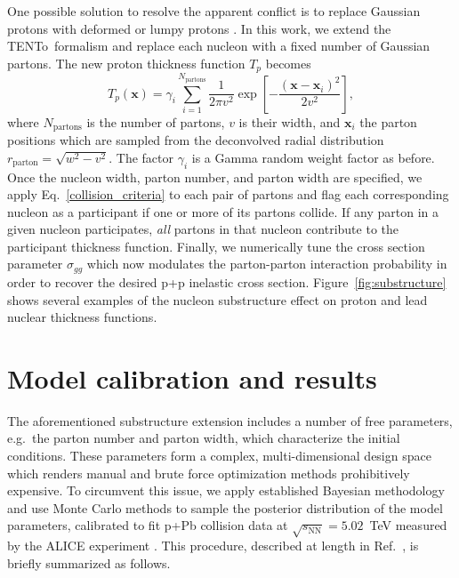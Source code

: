 \documentclass[3p,times,procedia]{elsarticle}
\newcommand{\trento}{T\raisebox{-0.3ex}{R}ENTo}
\begin{document}
One possible solution to resolve the apparent conflict is to replace Gaussian protons with deformed or lumpy protons \cite{Schenke:2014zha}.
In this work, we extend the \trento\ formalism and replace each nucleon with a fixed number of Gaussian partons.
The new proton thickness function $T_p$ becomes
\begin{equation}
  T_p(\mathbf{x}) = \gamma_i \sum\limits_{i=1}^{N_\mathrm{partons}} \frac{1}{2 \pi v^2} \exp\left[{-}\frac{(\mathbf{x} - \mathbf{x}_i)^2}{2 v^2}\right],
\end{equation}
where $N_\mathrm{partons}$ is the number of partons, $v$ is their width, and $\mathbf{x}_i$ the parton positions which are sampled from the deconvolved radial distribution $r_\mathrm{parton} = \sqrt{w^2 - v^2}$.
The factor $\gamma_i$ is a Gamma random weight factor as before.
Once the nucleon width, parton number, and parton width are specified, we apply Eq.~\eqref{collision_criteria} to each pair of partons and flag each corresponding nucleon as a participant if one or more of its partons collide.
If any parton in a given nucleon participates, \emph{all} partons in that nucleon contribute to the participant thickness function.
Finally, we numerically tune the cross section parameter $\sigma_{gg}$ which now modulates the parton-parton interaction probability in order to recover the desired p+p inelastic cross section.
Figure~\ref{fig:substructure} shows several examples of the nucleon substructure effect on proton and lead nuclear thickness functions.

\section{Model calibration and results}

The aforementioned substructure extension includes a number of free parameters, e.g.\ the parton number and parton width, which characterize the initial conditions.
These parameters form a complex, multi-dimensional design space which renders manual and brute force optimization methods prohibitively expensive. 
To circumvent this issue, we apply established Bayesian methodology \cite{Higdon:2008cmc} and use Monte Carlo methods to sample the posterior distribution of the model parameters, calibrated to fit p+Pb collision data at $\sqrt{s_\mathrm{NN}} = 5.02$~TeV measured by the ALICE experiment \cite{Abelev:2014mda}.
This procedure, described at length in Ref.~\cite{Bernhard:2016tnd}, is briefly summarized as follows.
\end{document}
